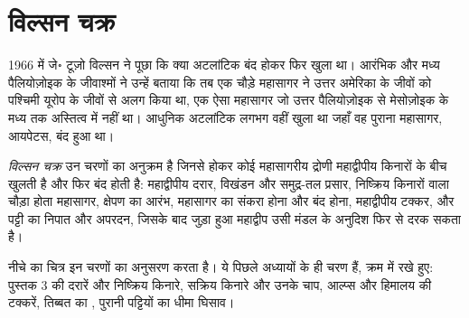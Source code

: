 \begin{omfigure}
\par{}
\end{omfigure}

\section{विल्सन चक्र}\label{sec:b2:wilson-cycle:cycle}

1966 में जे॰ टूज़ो विल्सन ने पूछा कि क्या अटलांटिक बंद होकर फिर
खुला था। आरंभिक और मध्य पैलियोज़ोइक के जीवाश्मों ने उन्हें बताया कि तब एक चौड़े महासागर ने
उत्तर अमेरिका के जीवों को पश्चिमी यूरोप के जीवों से अलग किया
था, एक ऐसा महासागर जो उत्तर पैलियोज़ोइक से मेसोज़ोइक के मध्य तक
अस्तित्व में नहीं था। आधुनिक अटलांटिक लगभग वहीं खुला था जहाँ वह पुराना महासागर, आयपेटस, बंद हुआ था।

\begin{definition}[विल्सन चक्र]\label{def:b2:wilson-cycle:wilson}
\emph{विल्सन चक्र} उन चरणों का अनुक्रम है जिनसे होकर कोई
महासागरीय द्रोणी महाद्वीपीय किनारों के बीच खुलती है और फिर बंद होती है: महाद्वीपीय दरार,
विखंडन और समुद्र-तल प्रसार, निष्क्रिय किनारों वाला चौड़ा होता महासागर, क्षेपण का
आरंभ, महासागर का संकरा होना और बंद होना, महाद्वीपीय टक्कर, और पट्टी का निपात
और अपरदन, जिसके बाद जुड़ा हुआ महाद्वीप उसी मंडल के अनुदिश फिर से दरक सकता है।
\end{definition}

नीचे का चित्र इन चरणों का अनुसरण करता है। ये पिछले अध्यायों के ही चरण हैं, क्रम में रखे हुए:
पुस्तक 3 की दरारें और निष्क्रिय किनारे, सक्रिय किनारे और उनके चाप,
आल्प्स और हिमालय की टक्करें, तिब्बत का , पुरानी पट्टियों का धीमा
घिसाव।

